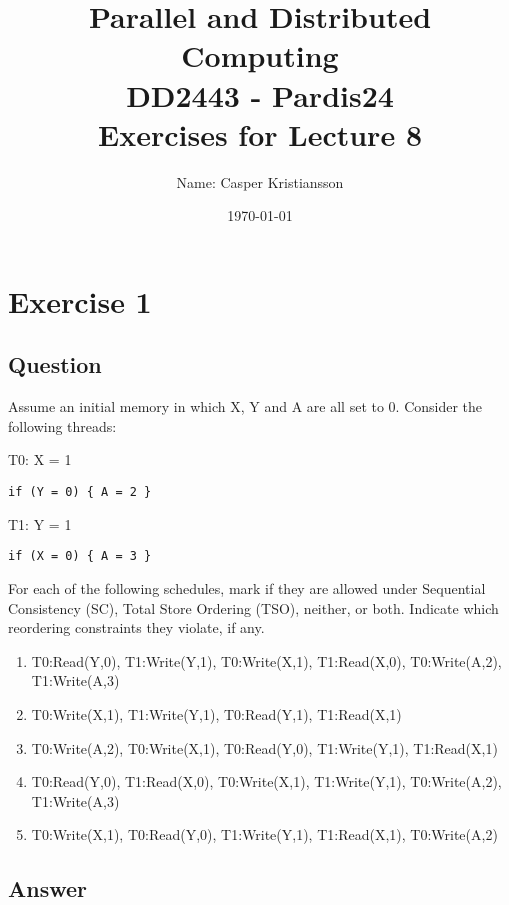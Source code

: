 \documentclass{article}
\title{\textbf{Parallel and Distributed Computing\\DD2443 - Pardis24\\Exercises for Lecture 8}}
\author{Name: Casper Kristiansson}
\date{\today}
\begin{document}
\setlength\parindent{0pt}
\setlength{\parskip}{\bigskipamount}

\maketitle
\section*{Exercise 1}
\subsection*{Question}
Assume an initial memory in which X, Y and A are all set to 0. Consider the following threads:

T0: X = 1

\texttt{if (Y = 0) \{ A = 2 \}}

T1: Y = 1

\texttt{if (X = 0) \{ A = 3 \}}

For each of the following schedules, mark if they are allowed under Sequential Consistency (SC), Total Store Ordering (TSO), neither, or both. Indicate which reordering constraints they violate, if any.

\begin{enumerate}
    \item T0:Read(Y,0), T1:Write(Y,1), T0:Write(X,1), T1:Read(X,0), T0:Write(A,2), T1:Write(A,3)
    \item T0:Write(X,1), T1:Write(Y,1), T0:Read(Y,1), T1:Read(X,1)
    \item T0:Write(A,2), T0:Write(X,1), T0:Read(Y,0), T1:Write(Y,1), T1:Read(X,1)
    \item T0:Read(Y,0), T1:Read(X,0), T0:Write(X,1), T1:Write(Y,1), T0:Write(A,2), T1:Write(A,3)
    \item T0:Write(X,1), T0:Read(Y,0), T1:Write(Y,1), T1:Read(X,1), T0:Write(A,2)
\end{enumerate}

\subsection*{Answer}
\end{document}
